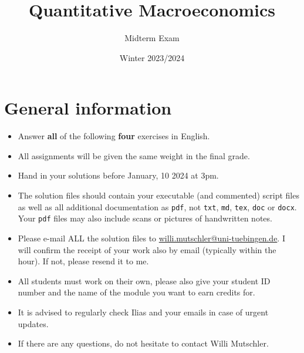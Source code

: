 \documentclass{article}
\begin{document}
	
\title{Quantitative Macroeconomics}
\author{Midterm Exam}
\date{Winter 2023/2024}
\maketitle

\section*{General information}
\begin{itemize}
	\item Answer \textbf{all} of the following \textbf{four} exercises in English.
	\item All assignments will be given the same weight in the final grade.
	\item Hand in your solutions before January, 10 2024 at 3pm.
	\item The solution files should contain your executable (and commented) script files
		as well as all additional documentation as \texttt{pdf}, not \texttt{txt}, \texttt{md}, \texttt{tex}, \texttt{doc} or \texttt{docx}.
	Your \texttt{pdf} files may also include scans or pictures of handwritten notes.
	\item Please e-mail ALL the solution files to \url{willi.mutschler@uni-tuebingen.de}.
	I will confirm the receipt of your work also by email (typically within the hour). If not, please resend it to me.
	\item All students must work on their own, please also give your student ID number and the name of the module you want to earn credits for.
	\item It is advised to regularly check Ilias and your emails in case of urgent updates.
	\item If there are any questions, do not hesitate to contact Willi Mutschler.
\end{itemize}

\newpage

	
\end{document}
